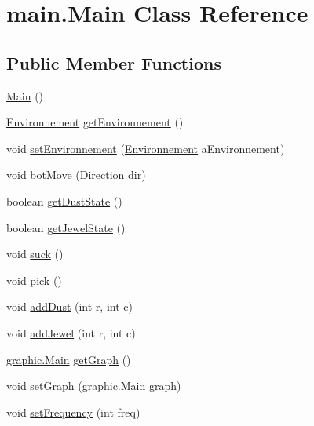 \hypertarget{classmain_1_1_main}{}\section{main.\+Main Class Reference}
\label{classmain_1_1_main}
\subsection*{Public Member Functions}
\begin{DoxyCompactItemize}
\item 
\hyperlink{classmain_1_1_main_a3bd36c15a333d7b594eb71f68a938492}{Main} ()
\item 
\hyperlink{classenvironnement_1_1_environnement}{Environnement} \hyperlink{classmain_1_1_main_a701386aa685b5e10807def95e010d915}{get\+Environnement} ()
\item 
void \hyperlink{classmain_1_1_main_aaf5877a75af1ae2d8f6e35ce6d624301}{set\+Environnement} (\hyperlink{classenvironnement_1_1_environnement}{Environnement} a\+Environnement)
\item 
void \hyperlink{classmain_1_1_main_a79f1b4e1ccb0a641c1d36973af32eca1}{bot\+Move} (\hyperlink{enum_i_a_1_1_direction}{Direction} dir)
\item 
boolean \hyperlink{classmain_1_1_main_a791b90bdd63a0a13054f10b7f4b4e27f}{get\+Dust\+State} ()
\item 
boolean \hyperlink{classmain_1_1_main_aa0df4a294d402074303f47f1fd33a766}{get\+Jewel\+State} ()
\item 
void \hyperlink{classmain_1_1_main_a95439ee2c099d18cc32c6ffd785540ab}{suck} ()
\item 
void \hyperlink{classmain_1_1_main_a007a1feb59e43e37f32b6d8625664986}{pick} ()
\item 
void \hyperlink{classmain_1_1_main_a07fa4830b941140965687c3a2dc8c2e9}{add\+Dust} (int r, int c)
\item 
void \hyperlink{classmain_1_1_main_aaa7affd0b1ef80da03008902969da99b}{add\+Jewel} (int r, int c)
\item 
\hyperlink{classgraphic_1_1_main}{graphic.\+Main} \hyperlink{classmain_1_1_main_a1daa1d9376ab5764f820ee594ff537ce}{get\+Graph} ()
\item 
void \hyperlink{classmain_1_1_main_ab5524b1612bb914ee34f0f0c6cc89a5f}{set\+Graph} (\hyperlink{classgraphic_1_1_main}{graphic.\+Main} graph)
\item 
void \hyperlink{classmain_1_1_main_a3cec64baca52714fb67467ec5d793249}{set\+Frequency} (int freq)

\end{DoxyCompactItemize}
